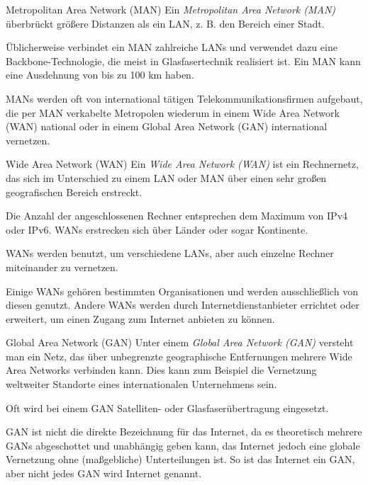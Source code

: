 \begin{defi}{Metropolitan Area Network (MAN)}
    Ein \emph{Metropolitan Area Network (MAN)} überbrückt größere Distanzen als ein LAN, z. B. den Bereich einer Stadt.

    Üblicherweise verbindet ein MAN zahlreiche LANs und verwendet dazu eine Backbone-Technologie, die meist in Glasfasertechnik realisiert ist.
    Ein MAN kann eine Ausdehnung von bis zu 100 km haben.

    MANs werden oft von international tätigen Telekommunikationsfirmen aufgebaut, die per MAN verkabelte Metropolen wiederum in einem Wide Area Network (WAN) national oder in einem Global Area Network (GAN) international vernetzen.
\end{defi}

\begin{defi}{Wide Area Network (WAN)}
    Ein \emph{Wide Area Network (WAN)} ist ein Rechnernetz, das sich im Unterschied zu einem LAN oder MAN über einen sehr großen geografischen Bereich erstreckt.

    Die Anzahl der angeschlossenen Rechner entsprechen dem Maximum von IPv4 oder IPv6.
    WANs erstrecken sich über Länder oder sogar Kontinente.

    WANs werden benutzt, um verschiedene LANs, aber auch einzelne Rechner miteinander zu vernetzen.

    Einige WANs gehören bestimmten Organisationen und werden ausschließlich von diesen genutzt.
    Andere WANs werden durch Internetdienstanbieter errichtet oder erweitert, um einen Zugang zum Internet anbieten zu können.
\end{defi}

\begin{defi}{Global Area Network (GAN)}
    Unter einem \emph{Global Area Network (GAN)} versteht man ein Netz, das über unbegrenzte geographische Entfernungen mehrere Wide Area Networks verbinden kann.
    Dies kann zum Beispiel die Vernetzung weltweiter Standorte eines internationalen Unternehmens sein.

    Oft wird bei einem GAN Satelliten- oder Glasfaserübertragung eingesetzt.

    GAN ist nicht die direkte Bezeichnung für das Internet, da es theoretisch mehrere GANs abgeschottet und unabhängig geben kann, das Internet jedoch eine globale Vernetzung ohne (maßgebliche) Unterteilungen ist.
    So ist das Internet ein GAN, aber nicht jedes GAN wird Internet genannt.
\end{defi}

